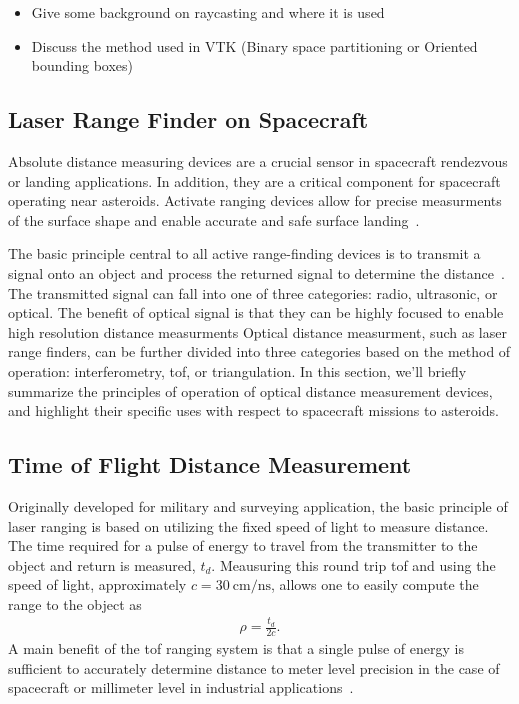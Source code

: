 \begin{itemize}
    \item Give some background on raycasting and where it is used
    \item Discuss the method used in VTK (Binary space partitioning or Oriented bounding boxes)
\end{itemize}

\subsection{Laser Range Finder on Spacecraft}

Absolute distance measuring devices are a crucial sensor in spacecraft rendezvous or landing applications.
In addition, they are a critical component for spacecraft operating near asteroids.
Activate ranging devices allow for precise measurments of the surface shape and enable accurate and safe surface landing~\cite{berry2013}.

The basic principle central to all active range-finding devices is to transmit a signal onto an object and process the returned signal to determine the distance~\cite{amann2001}.
The transmitted signal can fall into one of three categories: radio, ultrasonic, or optical.
The benefit of optical signal is that they can be highly focused to enable high resolution distance measurments
Optical distance measurment, such as laser range finders, can be further divided into three categories based on the method of operation: interferometry, \gls{tof}, or triangulation.
In this section, we'll briefly summarize the principles of operation of optical distance measurement devices, and highlight their specific uses with respect to spacecraft missions to asteroids.

\subsection{Time of Flight Distance Measurement}
Originally developed for military and surveying application, the basic principle of laser ranging is based on utilizing the fixed speed of light to measure distance.
The time required for a pulse of energy to travel from the transmitter to the object and return is measured, \( t_d \). 
Meausuring this round trip \gls{tof} and using the speed of light, approximately \( c = \SI{30}{\centi\meter\per\nano\second}\), allows one to easily compute the range to the object as
\begin{align}
    \rho = \frac{t_d}{2 c}. 
\end{align}
A main benefit of the \gls{tof} ranging system is that a single pulse of energy is sufficient to accurately determine distance to meter level precision in the case of spacecraft or millimeter level in industrial applications~\cite{zuber1997,cole1998,amann2001}.


